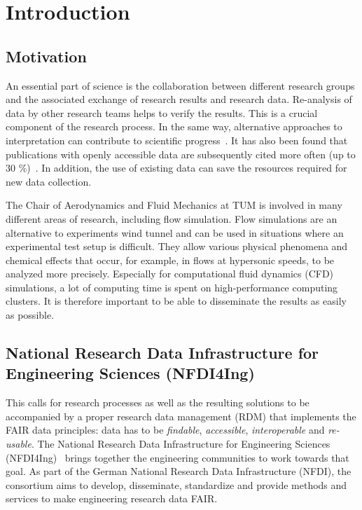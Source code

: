 
\chapter{Introduction}\label{chapter:introduction}

\section{Motivation}

An essential part of science is the collaboration between different research
groups and the associated exchange of research results and research data.
Re-analysis of data by other research teams helps to verify the results. This is
a crucial component of the research process. In the same way, alternative
approaches to interpretation can contribute to scientific
progress~\cite{tenopir2011data}. It has also been found that publications with
openly accessible data are subsequently cited more often (up to 30
\%)~\cite{piwowar2013data}. In addition, the use of existing data can save the
resources required for new data collection. 

The Chair of Aerodynamics and Fluid Mechanics at TUM is involved in many
different areas of research, including flow simulation. Flow simulations are an
alternative to experiments wind tunnel and can be used in situations where an
experimental test setup is difficult. They allow various physical phenomena and
chemical effects that occur, for example, in flows at hypersonic speeds, to be
analyzed more precisely. Especially for computational fluid dynamics (CFD)
simulations, a lot of computing time is spent on high-performance computing
clusters. It is therefore important to be able to disseminate the results as
easily as possible.

\section{National Research Data Infrastructure for Engineering Sciences
(NFDI4Ing)}

This calls for research processes as well as the resulting solutions to be
accompanied by a proper research data management (RDM) that implements the FAIR
data principles: data has to be \textit{findable}, \textit{accessible},
\textit{interoperable} and \textit{re-usable}. The National Research Data
Infrastructure for Engineering Sciences (NFDI4Ing)~\cite{schmitt2020nfdi4ing}
brings together the engineering communities to work towards that goal. As part
of the German National Research Data Infrastructure (NFDI), the consortium aims
to develop, disseminate, standardize and provide methods and services to make
engineering research data FAIR. 

